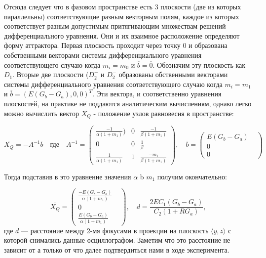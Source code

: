 \documentclass[12pt]{article}
\begin{document}
Отсюда следует что в фазовом пространстве есть 3 плоскости (две из которых параллельны) соответствующие разным  векторным полям, каждое из которых соответствует разным  допустимым притягивающим множествам решений дифференциального уравнения. Они и их взаимное расположение определяют  форму аттрактора. Первая плоскость проходит через точку 0 и образована собственными векторами системы дифференциального уравнения соответствующего случаю когда $m_i = m_0$ и $\overline{b} = \overline{0}$. Обозначим эту плоскость как $D_1$. Вторые две плоскости ($D_2^+$ и $D_2^-$ образованы  обственными векторами системы дифференциального уравнения соответствующего случаю когда $m_i = m_1$ и $\overline{b} = ( E(G_b - G_a),  0,  0)^{T}$. Эти вектора, и соответственно уравнения плоскостей, на практике не поддаются аналитическим вычислениям, однако легко можно вычислить вектор $\overline{X_Q}$  - положение узлов равновесия в пространстве:



\begin{equation}
	\overline{X_Q} = -A^{-1}\overline{b}
	\quad \textit{где} \quad A^{-1}=
	\begin{pmatrix}
		\frac{-1}{\alpha(1+m_{1})}) & 0 & \frac{-1}{\beta(1+m_1)}   \\
		0                           & 0 & \frac{1}{\beta}           \\
		\frac{1}{\alpha(1+m_1)}     & 1 & \frac{-m_1}{\beta(1+m_1)}
	\end{pmatrix},
	\quad \overline{b} =
	\begin{pmatrix}
		E(G_b - G_a) \\
		0 &          \\
		0 &
	\end{pmatrix}
\end{equation}

Тогда подставив в это уравнение значения $\alpha$ b $m_1$ получим окончательно:

\begin{equation}
	\overline{X_Q}=
	\begin{pmatrix}
		\frac{-E(G_b-G_a)}{\alpha(1+m_{1})} \\
		0 &                                  \\
		\frac{E(G_b-G_a)}{\alpha(1+m_1)}
	\end{pmatrix}, \quad d = \frac{2EC_1(G_b -G_a)}{C_2(1+RG_a)},
\end{equation}
где $d$ --- расстояние между 2-мя фокусами в проекции на плоскость $\langle y,z \rangle $ с которой снимались данные осциллографом. Заметим что это расстояние не зависит от а только от что далее подтвердиться нами в ходе эксперимента.
\end{document}
